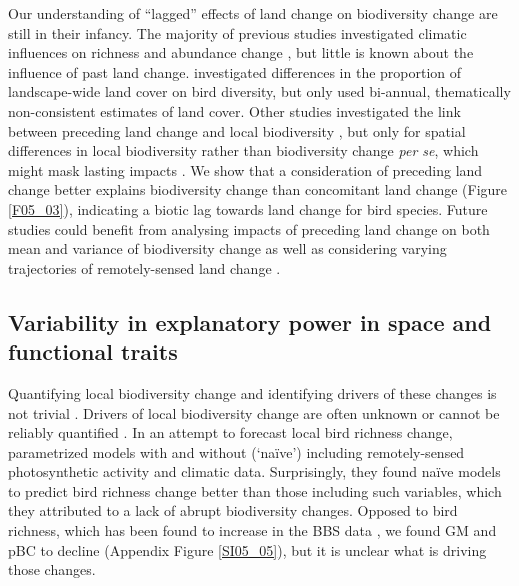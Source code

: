 Our understanding of “lagged” effects of land change on biodiversity change are still in their infancy. The majority of previous studies investigated climatic influences on richness and abundance change \citep{Albright2011,Lindstrom2013,Valtonen2013,Martay2017}, but little is known about the influence of past land change. \cite{Rittenhouse2012} investigated differences in the proportion of landscape-wide land cover on bird diversity, but only used bi-annual, thematically non-consistent estimates of land cover. Other studies investigated the link between preceding land change and local biodiversity \citep[Chapter \ref{C02}-\ref{C03} in this thesis, ][]{Jung2018}, but only for spatial differences in local biodiversity rather than biodiversity change \textit{per se}, which might mask lasting impacts \citep{Franca2016,DePalma2018}. We show that a consideration of preceding land change better explains biodiversity change than concomitant land change (Figure \ref{F05_03}), indicating a biotic lag towards land change for bird species. Future studies could benefit from analysing impacts of preceding land change on both mean and variance of biodiversity change \citep{Leung2017,Christensen2018} as well as considering varying trajectories of remotely-sensed land change \citep{Watson2014}.

\subsection{Variability in explanatory power in space and functional traits}
\label{C05_0403}

Quantifying local biodiversity change and identifying drivers of these changes is not trivial \citep{Dornelas2013,Cardinale2018}. Drivers of local biodiversity change are often unknown or cannot be reliably quantified \citep{Hallmann2017}. In an attempt to forecast local bird richness change, \cite{Harris2018} parametrized models with and without (‘na\"{i}ve’) including remotely-sensed photosynthetic activity and climatic data. Surprisingly, they found na\"{i}ve models to predict bird richness change better than those including such variables, which they attributed to a lack of abrupt biodiversity changes. Opposed to bird richness, which has been found to increase in the BBS data \citep{Schipper2016}, we found GM and pBC to decline (Appendix Figure \ref{SI05_05}), but it is unclear what is driving those changes.

